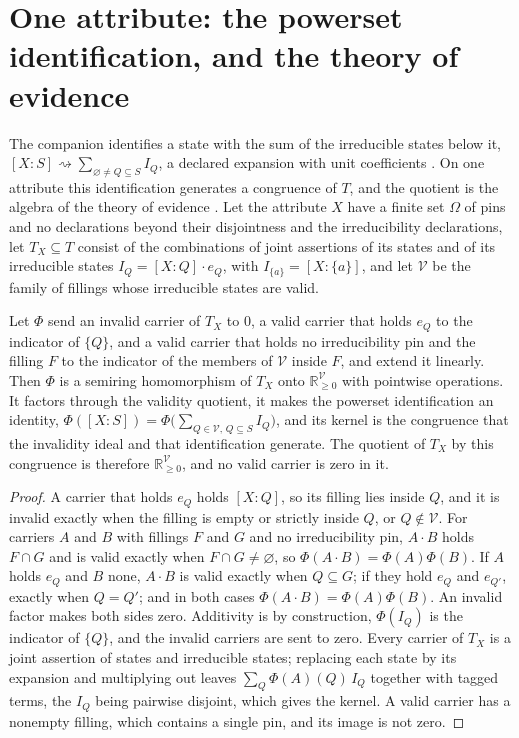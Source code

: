 \section{One attribute: the powerset identification, and the theory of evidence}\label{sec:evidence}

\noindent The companion identifies a state with the sum of the irreducible states below it, $[X : S] \rightsquigarrow \sum_{\varnothing \neq Q \subseteq S} I_Q$, a declared expansion with unit coefficients \cite{Aethus}. On one attribute this identification generates a congruence of $T$, and the quotient is the algebra of the theory of evidence \cite{AethusEvidence}. Let the attribute $X$ have a finite set $\Omega$ of pins and no declarations beyond their disjointness and the irreducibility declarations, let $T_X \subseteq T$ consist of the combinations of joint assertions of its states and of its irreducible states $I_Q = [X : Q] \cdot e_Q$, with $I_{\{a\}} = [X : \{a\}]$, and let $\mathcal{V}$ be the family of fillings whose irreducible states are valid.

\begin{theorem}\label{thm:evidence-splitting}
Let $\Phi$ send an invalid carrier of $T_X$ to $0$, a valid carrier that holds $e_Q$ to the indicator of $\{Q\}$, and a valid carrier that holds no irreducibility pin and the filling $F$ to the indicator of the members of $\mathcal{V}$ inside $F$, and extend it linearly. Then $\Phi$ is a semiring homomorphism of $T_X$ onto $\mathbb{R}_{\geq 0}^{\mathcal{V}}$ with pointwise operations. It factors through the validity quotient, it makes the powerset identification an identity, $\Phi([X : S]) = \Phi\big(\sum_{Q \in \mathcal{V},\, Q \subseteq S} I_Q\big)$, and its kernel is the congruence that the invalidity ideal and that identification generate. The quotient of $T_X$ by this congruence is therefore $\mathbb{R}_{\geq 0}^{\mathcal{V}}$, and no valid carrier is zero in it.
\end{theorem}

\begin{proof}
A carrier that holds $e_Q$ holds $[X : Q]$, so its filling lies inside $Q$, and it is invalid exactly when the filling is empty or strictly inside $Q$, or $Q \notin \mathcal{V}$. For carriers $A$ and $B$ with fillings $F$ and $G$ and no irreducibility pin, $A \cdot B$ holds $F \cap G$ and is valid exactly when $F \cap G \neq \varnothing$, so $\Phi(A \cdot B) = \Phi(A)\Phi(B)$. If $A$ holds $e_Q$ and $B$ none, $A \cdot B$ is valid exactly when $Q \subseteq G$; if they hold $e_Q$ and $e_{Q'}$, exactly when $Q = Q'$; and in both cases $\Phi(A \cdot B) = \Phi(A)\Phi(B)$. An invalid factor makes both sides zero. Additivity is by construction, $\Phi(I_Q)$ is the indicator of $\{Q\}$, and the invalid carriers are sent to zero. Every carrier of $T_X$ is a joint assertion of states and irreducible states; replacing each state by its expansion and multiplying out leaves $\sum_Q \Phi(A)(Q)\, I_Q$ together with tagged terms, the $I_Q$ being pairwise disjoint, which gives the kernel. A valid carrier has a nonempty filling, which contains a single pin, and its image is not zero.
\end{proof}


